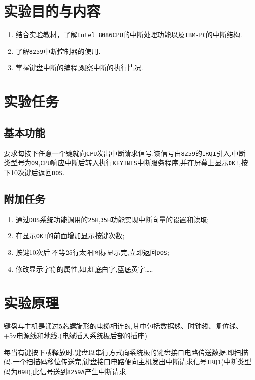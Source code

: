 \documentclass[11pt]{SEU-Digital-Report}
\begin{document}
\exptitlepage

\tableofcontents
\newpage

\section{实验目的与内容}       
\begin{enumerate}
    \item 结合实验教材\cite{book,guide}，了解\texttt{Intel 8086CPU}的中断处理功能以及\texttt{IBM-PC}的中断结构.
    \item 了解\texttt{8259}中断控制器的使用.
    \item 掌握键盘中断的编程,观察中断的执行情况. 
\end{enumerate}

\section{实验任务}
\subsection{基本功能}
要求每按下任意一个键就向\texttt{CPU}发出中断请求信号,该信号由\texttt{8259}的\texttt{IRQ1}引入,中断类型号为\texttt{09},\texttt{CPU}响应中断后转入执行\texttt{KEYINTS}中断服务程序,并在屏幕上显示\texttt{OK!},按下10次键后返回\texttt{DOS}.

\subsection{附加任务}
\begin{enumerate}
    \item 通过\texttt{DOS}系统功能调用的\texttt{25H},\texttt{35H}功能实现中断向量的设置和读取;
    \item 在显示\texttt{OK!}的前面增加显示按键次数;
    \item 按键10次后,不等25行太阳图标显示完,立即返回\texttt{DOS};
    \item 修改显示字符的属性,如,红底白字,蓝底黄字…… 
\end{enumerate}

\section{实验原理}
键盘与主机是通过5芯螺旋形的电缆相连的,其中包括数据线、时钟线、复位线、+5v电源线和地线.(电缆插入系统板后部的插座)

每当有键按下或释放时,键盘以串行方式向系统板的键盘接口电路传送数据,即扫描码.一个扫描码移位传送完,键盘接口电路便向主机发出中断请求信号\texttt{IRQ1}(中断类型码为\texttt{09H}),此信号送到\texttt{8259A}产生中断请求.
\end{document}
